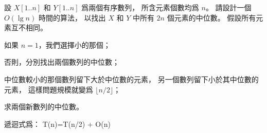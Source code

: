 \startEXERCISE[exercise:9.3-8]
設 $X[1..n]$ 和 $Y[1..n]$ 爲兩個有序數列，
所含元素個數均爲 $n$。
請設計一個 $O(\lg{n})$ 時間的算法，
以找出 $X$ 和 $Y$ 中所有 $2n$ 個元素的中位數。
假設所有元素互不相同。
\stopEXERCISE

\startANSWER
\startigNum
\item 如果 $n=1$，我們選擇小的那個；
\item 否則，分別找出兩個數列的中位數；
\item 中位數較小的那個數列留下大於中位數的元素，
另一個數列留下小於其中位數的元素，
這樣問題規模就變爲 $\lfloor n/2 \rfloor$；
\item 求兩個新數列的中位數。
\stopigNum

遞迴式爲：
\startformula
T(n)=T(n/2) + O(n)
\stopformula
\stopANSWER
